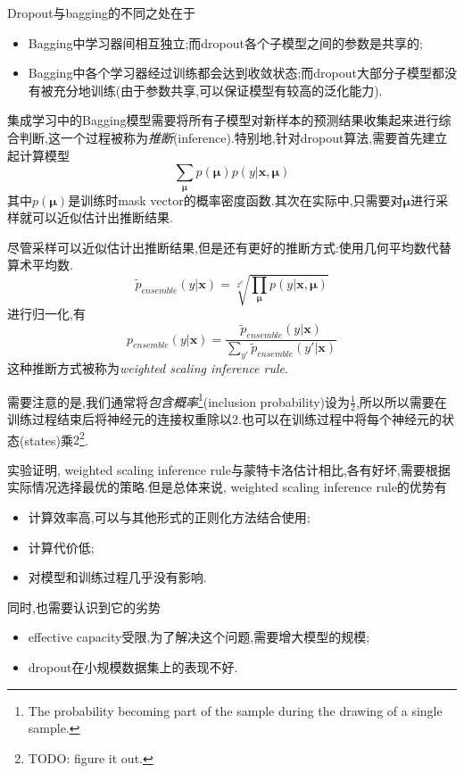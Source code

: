 Dropout与bagging的不同之处在于
\begin{itemize}
    \item Bagging中学习器间相互独立;而dropout各个子模型之间的参数是共享的;
    \item Bagging中各个学习器经过训练都会达到收敛状态;而dropout大部分子模型都没有被充分地训练(由于参数共享,可以保证模型有较高的泛化能力).
\end{itemize}

集成学习中的Bagging模型需要将所有子模型对新样本的预测结果收集起来进行综合判断,这一个过程被称为\textit{推断}(inference).特别地,针对dropout算法,需要首先建立起计算模型
\begin{equation}
\sum_{\bm\mu}p(\bm\mu)p(y|\bm{x,\mu})
\end{equation}
其中$p(\bm\mu)$是训练时mask vector的概率密度函数.其次在实际中,只需要对$\bm\mu$进行采样就可以近似估计出推断结果.

尽管采样可以近似估计出推断结果,但是还有更好的推断方式:使用几何平均数代替算术平均数.
\begin{equation}
\tilde p_{ensemble}(y|\bm x)=\sqrt[2^d]{\prod_{\bm\mu}p(y|\bm{x,\mu})}
\end{equation}
进行归一化,有
\begin{equation}
p_{ensemble}(y|\bm x)=\frac{\tilde p_{ensemble}(y|\bm x)}{\sum_{y'}\tilde p_{ensemble}(y'|\bm x)}
\end{equation}
这种推断方式被称为\textit{weighted scaling inference rule}.

需要注意的是,我们通常将\textit{包含概率}\footnote{The probability becoming part of the sample during the drawing of a single sample.}(inclusion probability)设为$\frac{1}{2}$,所以所以需要在训练过程结束后将神经元的连接权重除以$2$.也可以在训练过程中将每个神经元的状态(states)乘$2$\footnote{TODO: figure it out.}.

实验证明, weighted scaling inference rule与蒙特卡洛估计相比,各有好坏,需要根据实际情况选择最优的策略.但是总体来说, weighted scaling inference rule的优势有
\begin{itemize}
    \item 计算效率高,可以与其他形式的正则化方法结合使用;
    \item 计算代价低;
    \item 对模型和训练过程几乎没有影响.
\end{itemize}
同时,也需要认识到它的劣势
\begin{itemize}
    \item effective capacity受限,为了解决这个问题,需要增大模型的规模;
    \item dropout在小规模数据集上的表现不好.
\end{itemize}

